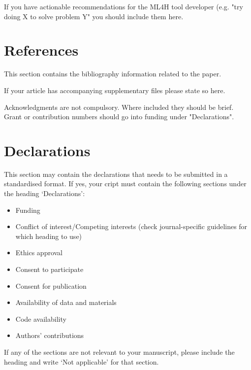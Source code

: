 \documentclass{article}
\begin{document}
If you have actionable recommendations for the ML4H tool developer (e.g. "try doing X to solve problem Y" you should include them here.


\section{References}
This section contains the bibliography information related to the paper.




If your article has accompanying supplementary files please state so here. 


Acknowledgments are not compulsory. Where included they should be brief. Grant or contribution numbers should go into funding under "Declarations".

\section*{Declarations}
This section may contain the declarations that needs to be submitted in a standardised format. If yes, your cript must contain the following sections under the heading `Declarations':

\begin{itemize}
\item Funding
\item Conflict of interest/Competing interests (check journal-specific guidelines for which heading to use)
\item Ethics approval 
\item Consent to participate
\item Consent for publication
\item Availability of data and materials
\item Code availability 
\item Authors' contributions
\end{itemize}

\noindent
If any of the sections are not relevant to your manuscript, please include the heading and write `Not applicable' for that section. 


\end{document}
